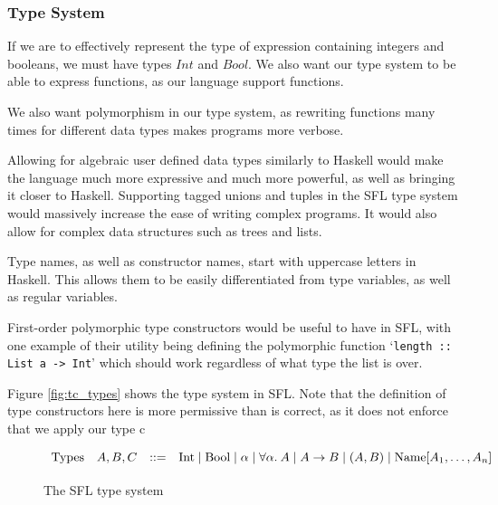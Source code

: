\subsubsection{Type System}
\label{sec:type_system_design}
If we are to effectively represent the type of expression containing integers and booleans, we must have types $Int$ and $Bool$. We also want our type system to be able to express functions, as our language support functions. 

We also want polymorphism in our type system, as rewriting functions many times for different data types makes programs more verbose.  

Allowing for algebraic user defined data types similarly to Haskell would make the language much more expressive and much more powerful, as well as bringing it closer to Haskell. Supporting tagged unions and tuples in the \ac{SFL} type system would massively increase the ease of writing complex programs. It would also allow for complex data structures such as trees and lists. 

Type names, as well as constructor names,  start with uppercase letters in Haskell. This allows them to be easily differentiated from type variables, as well as regular variables.

First-order polymorphic type constructors would be useful to have in \ac{SFL}, with one example of their utility being defining the polymorphic function `\verb|length :: List a -> Int|' which should work regardless of what type the list is over. 

Figure \ref{fig:tc_types} shows the type system in SFL. Note that the definition of type constructors here is more permissive than is correct, as it does not enforce that we apply our type c

% 


\begin{figure}
    \[
        \begin{array}{llcl}
            \text{Types} & A, B, C & \mathrel{::=} &
                \text{Int} \mathrel{\mid} 
                \text{Bool} \mathrel{\mid} 
                \alpha \mathrel{\mid} \forall\alpha.\:{A} \mathrel{\mid} 
                A \rightarrow B \mathrel{\mid} (A, B) \mathrel{\mid} \text{Name}[A_1, \dots, A_n]
            \\[2pt]
        \end{array}
    \]
    \caption{The SFL type system}
    \label{fig:sfl_types_no_exst}
\end{figure}

